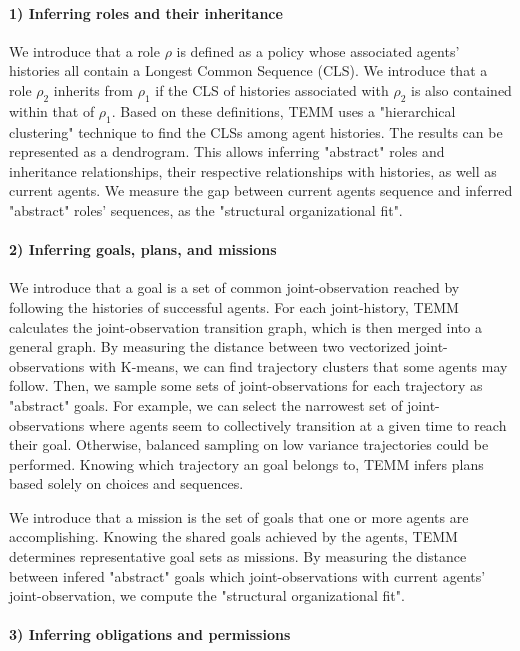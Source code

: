 \documentclass[sigconf,anonymous]{aamas}
\begin{document}
\paragraph{\textbf{1) Inferring roles and their inheritance}}

We introduce that a role $\rho$ is defined as a policy whose associated agents' histories all contain a Longest Common Sequence (CLS). We introduce that a role $\rho_2$ inherits from $\rho_1$ if the CLS of histories associated with $\rho_2$ is also contained within that of $\rho_1$.
Based on these definitions, TEMM uses a "hierarchical clustering" technique to find the CLSs among agent histories. The results can be represented as a dendrogram. This allows inferring "abstract" roles and inheritance relationships, their respective relationships with histories, as well as current agents.
We measure the gap between current agents sequence and inferred "abstract" roles' sequences, as the "structural organizational fit".

\paragraph{\textbf{2) Inferring goals, plans, and missions}}

We introduce that a goal is a set of common joint-observation reached by following the histories of successful agents.
For each joint-history, TEMM calculates the joint-observation transition graph, which is then merged into a general graph. By measuring the distance between two vectorized joint-observations with K-means, we can find trajectory clusters that some agents may follow. Then, we sample some sets of joint-observations for each trajectory as "abstract" goals. For example, we can select the narrowest set of joint-observations where agents seem to collectively transition at a given time to reach their goal. Otherwise, balanced sampling on low variance trajectories could be performed. Knowing which trajectory an goal belongs to, TEMM infers plans based solely on choices and sequences.

We introduce that a mission is the set of goals that one or more agents are accomplishing.
Knowing the shared goals achieved by the agents, TEMM determines representative goal sets as missions.
By measuring the distance between infered "abstract" goals which joint-observations with current agents' joint-observation, we compute the "structural organizational fit".

\paragraph{\textbf{3) Inferring obligations and permissions}}
\end{document}
